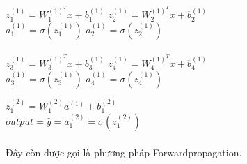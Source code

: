 \documentclass{report}
\newcommand\tab[1][1.25cm]{\hspace*{#1}}
\begin{document}
            \tab[1cm]$z_1^{(1)} = W_1^{{(1)}^T} x + b_1^{(1)}$ \tab[6cm]$z_2^{(1)} = W_2^{{(1)}^T} x + b_2^{(1)}$\\
            \tab[1.75cm]$a_1^{(1)} =\sigma (z_1^{(1)})$ \tab[7.25cm]$a_2^{(1)} =\sigma (z_2^{(1)})$\\\\
            \tab[1.5cm]$z_3^{(1)} = W_3^{{(1)}^T} x + b_3^{(1)}$ \tab[6cm]$z_4^{(1)} = W_4^{{(1)}^T} x + b_4^{(1)}$\\
            \tab[1.75cm]$a_3^{(1)} =\sigma (z_3^{(1)})$ \tab[7.25cm]$a_4^{(1)} =\sigma (z_4^{(1)})$
            
            \begin{center}
                $z_1^{(2)} = W_1^{(2)} a^{(1)} + b_1^{(2)}$\\
                $output = \hat{y} = a_1^{(2)} = \sigma (z_1^{(2)}) $
            \end{center}
            \fontsize{13}{10}\selectfont\paragraph{}\tab[0.75cm]Đây còn được gọi là phương pháp Forwardpropagation.
        
        \fontsize{15}{10}\selectfont
\end{document}
